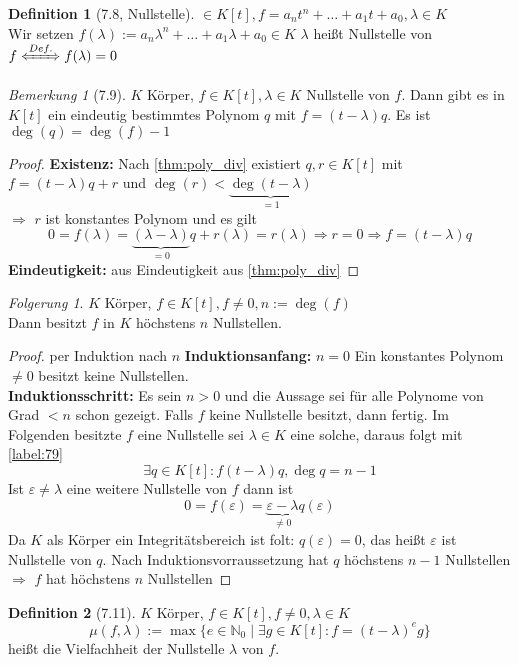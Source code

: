 \documentclass[a4paper]{scrartcl}
\DeclareMathOperator{\Exists}{\exists}
\theoremstyle{definition}
\newtheorem{defn}{Definition}
\theoremstyle{plain}
\theoremstyle{plain}
\theoremstyle{remark}
\newtheorem{remark}{Bemerkung}
\theoremstyle{remark}
\newtheorem{conc}{Folgerung}
\theoremstyle{remark}
\begin{document}
\begin{defn}[7.8, Nullstelle]
$\in K[t], f = a_n t^n + \ldots + a_1 t + a_0, \lambda \in K$ \\
  Wir setzen $f(\lambda) := a_n \lambda^n + \ldots + a_1\lambda + a_0 \in K$
$\lambda$ heißt Nullstelle von $f \xLeftrightarrow{Def.} f(\lambda) = 0$
\end{defn}
\begin{remark}[7.9]
\label{remark:79}
$K$ Körper, $f\in K[t], \lambda \in K$ Nullstelle von $f$. Dann gibt es in $K[t]$ ein eindeutig bestimmtes Polynom $q$ mit $f = (t - \lambda)q$.
Es ist $\deg(q) = \deg(f) - 1$
\end{remark}
\begin{proof}
\textbf{Existenz:} Nach \ref{thm:poly_div} existiert $q,r\in K[t]$ mit $f = (t - \lambda)q + r$ und $\deg(r) < \underbrace{\deg(t - \lambda)}_{= 1}$ \\
  $\Rightarrow$ $r$ ist konstantes Polynom und es gilt
\[0 = f(\lambda) = \underbrace{(\lambda - \lambda)}_{= 0} q + r(\lambda) = r(\lambda) \Rightarrow r = 0 \Rightarrow f = (t - \lambda) q\]
\textbf{Eindeutigkeit:} aus Eindeutigkeit aus \ref{thm:poly_div}
\end{proof}
\begin{conc}
$K$ Körper, $f\in K[t], f\neq 0, n:= \deg(f)$ \\
  Dann besitzt $f$ in $K$ höchstens $n$ Nullstellen.
\end{conc}
\begin{proof}
per Induktion nach $n$
\textbf{Induktionsanfang:} $n = 0$ Ein konstantes Polynom $\neq 0$ besitzt keine Nullstellen. \\
  \textbf{Induktionsschritt:} Es sein $n > 0$ und die Aussage sei für alle Polynome von Grad $< n$ schon gezeigt.
Falls $f$ keine Nullstelle besitzt, dann fertig.
Im Folgenden besitzte $f$ eine Nullstelle sei $\lambda \in K$ eine solche, daraus folgt mit \ref{label:79}
\[\exists q\in K[t]: f(t - \lambda)q, \deg{q} = n - 1\]
Ist $\varepsilon \neq \lambda$ eine weitere Nullstelle von $f$ dann ist
\[0 = f(\varepsilon) = \underbrace{\varepsilon - \lambda}_{\neq 0}q(\varepsilon)\]
Da $K$ als Körper ein Integritätsbereich ist folt: $q(\varepsilon) = 0$, das heißt $\varepsilon$ ist Nullstelle von $q$.
Nach Induktionsvorraussetzung hat $q$ höchstens $n-1$ Nullstellen $\Rightarrow$ $f$ hat höchstens $n$ Nullstellen
\end{proof}
\begin{defn}[7.11]
\label{dfn:zero}
$K$ Körper, $f\in K[t], f\neq 0,\lambda \in K$
\[\mu (f,\lambda) := \max\{e\in\mathbb{N}_0 \mid \Exists g\in K[t]: f = (t - \lambda)^e g\}\]
heißt die Vielfachheit der Nullstelle $\lambda$ von $f$.
\end{defn}
\end{document}
